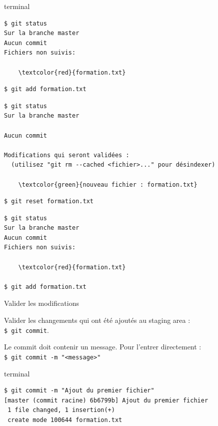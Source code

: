 \documentclass[usepdftitle=false]{beamer}
\def\seplength{.3\topsep}
\newcommand{\Pause}{%
\ifdef{\Release}
  {\pause}
  {}
}
\begin{document}
\begin{frame}[fragile]
\begin{beamercolorbox}[rounded=true,shadow=true]{terminal}
\vspace{-\seplength}
\begin{Verbatim}
$ git status
Sur la branche master
Aucun commit
Fichiers non suivis:

	\textcolor{red}{formation.txt}
\end{Verbatim}
\Pause
\vspace{-\seplength}
\begin{Verbatim}
$ git add formation.txt
\end{Verbatim}
\Pause
\vspace{-\seplength}
\begin{Verbatim}
$ git status
Sur la branche master

Aucun commit

Modifications qui seront validées :
  (utilisez "git rm --cached <fichier>..." pour désindexer)

	\textcolor{green}{nouveau fichier : formation.txt}
\end{Verbatim}
\Pause
\vspace{-\seplength}
\begin{Verbatim}
$ git reset formation.txt
\end{Verbatim}
\Pause
\vspace{-\seplength}
\begin{Verbatim}
$ git status
Sur la branche master
Aucun commit
Fichiers non suivis:

	\textcolor{red}{formation.txt}

$ git add formation.txt
\end{Verbatim}
\end{beamercolorbox}
\end{frame}

\begin{frame}[fragile]{Valider les modifications}

Valider les changements qui ont été ajoutés au staging area :\\
\verb+$ git commit+.

\medskip

Le commit doit contenir un message. Pour l'entrer directement : \\
\verb+$ git commit -m "<message>"+ \\

\bigskip

\begin{beamercolorbox}[rounded=true,shadow=true]{terminal}
\vspace{-\seplength}
\begin{Verbatim}
$ git commit -m "Ajout du premier fichier"
[master (commit racine) 6b6799b] Ajout du premier fichier
 1 file changed, 1 insertion(+)
 create mode 100644 formation.txt
\end{Verbatim}
\end{beamercolorbox}


\end{frame}
\end{document}
